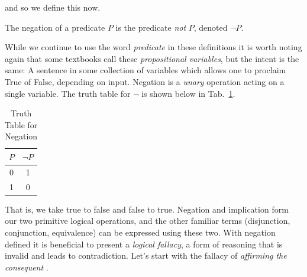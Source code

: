         and so we define this now.
        \begin{definition}
            \label{def:Negation}%
            The negation of a \gls{predicate} $P$ is the predicate \textit{not}
            $P$, denoted $\neg{P}$.
        \end{definition}
        While we continue to use the word \textit{predicate} in these
        definitions it is worth noting again that some textbooks call these
        \textit{propositional variables}, but the
        intent is the same: A sentence in some collection of variables which
        allows one to proclaim True of False, depending on input. Negation is a
        \textit{unary} operation acting on a single variable. The truth table
        for $\neg$ is shown below in Tab.~\ref{tab:Truth_Table_Negation}.
        \begin{table}[H]
            \centering
            \captionsetup{type=table}
            \begin{tabular}{c|c}
                $P$&$\neg{P}$\\
                \hline
                0&1\\
                1&0
            \end{tabular}
            \caption{Truth Table for Negation}
            \label{tab:Truth_Table_Negation}
        \end{table}
        That is, we take true to false and false to true. Negation and
        implication form our two primitive logical operations, and the other
        familiar terms (disjunction, conjunction, equivalence) can be expressed
        using these two. With negation defined it is beneficial to present a
        \textit{logical fallacy}, a form of reasoning
        that is invalid and leads to contradiction. Let's start with the fallacy
        of \textit{affirming the consequent}%
        .
